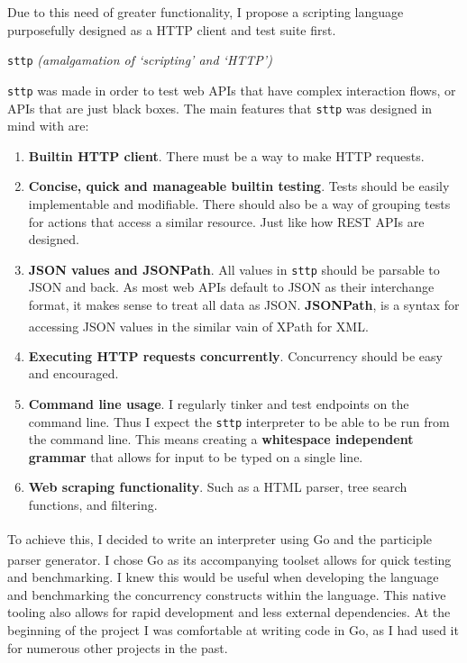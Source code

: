 \documentclass[]{full}
\theoremstyle{definition}
\begin{document}
Due to this need of greater functionality, I propose a scripting language purposefully designed as a HTTP client and test suite first.

\begin{center}
\verb|sttp| \textit{(amalgamation of `scripting' and `HTTP')}
\end{center}

\verb|sttp| was made in order to test web APIs that have complex interaction flows, or APIs that are just black boxes. The main features that \verb|sttp| was designed in mind with are:

\begin{enumerate}
    \item \textbf{Builtin HTTP client}. There must be a way to make HTTP requests.
    \item \textbf{Concise, quick and manageable builtin testing}. Tests should be easily implementable and modifiable. There should also be a way of grouping tests for actions that access a similar resource. Just like how REST APIs are designed.
    \item \textbf{JSON values and JSONPath}. All values in \verb|sttp| should be parsable to JSON and back. As most web APIs default to JSON as their interchange format, it makes sense to treat all data as JSON. \textbf{JSONPath}, is a syntax for accessing JSON values in the similar vain of XPath for XML\textsuperscript{\cite{goessner_2007}}.
    \item \textbf{Executing HTTP requests concurrently}. Concurrency should be easy and encouraged.
    \item \textbf{Command line usage}. I regularly tinker and test endpoints on the command line. Thus I expect the \verb|sttp| interpreter to be able to be run from the command line. This means creating a \textbf{whitespace independent grammar} that allows for input to be typed on a single line.
    \item \textbf{Web scraping functionality}. Such as a HTML parser, tree search functions, and filtering.
\end{enumerate}

To achieve this, I decided to write an interpreter using Go\textsuperscript{\cite{the_go_programming_language}} and the participle parser generator\textsuperscript{\cite{thomas_2021}}. I chose Go as its accompanying toolset allows for quick testing and benchmarking. I knew this would be useful when developing the language and benchmarking the concurrency constructs within the language. This native tooling also allows for rapid development and less external dependencies. At the beginning of the project I was comfortable at writing code in Go, as I had used it for numerous other projects in the past.
\end{document}
